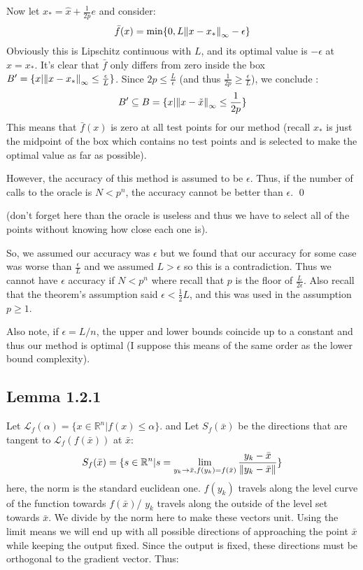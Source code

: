 \documentclass[12pt,a4paper]{article}
\newcommand{\hlabel}{\phantomsection\label}
\begin{document}
	Now let $x_* = \hat{x} + \frac{1}{2p}e$ and consider:
	\begin{align*}
		\bar{f}(x) = \min \{0, L \norm{x-x_*}_\infty - \epsilon\}
	\end{align*}
	Obviously this is Lipschitz continuous with $L$, and its optimal value is $-\epsilon$ at $ x = x_*$. It's clear that $\bar{f}$ only differs from zero inside the box $B' = \{x| \norm{x - x_*}_\infty \leq \frac{\epsilon}{L}\}$.  Since $2p \leq \frac{L}{\epsilon}$ (and thus $\frac{1}{2p} \geq \frac{\epsilon}{L}$), we conclude :
	\begin{align*}
		B' \subseteq B = \{x | \norm{x - \tilde{x}}_\infty \leq \frac{1}{2p}\}
	\end{align*}
	This means that $\bar{f}(x)$ is zero at all test points for our method (recall $x_*$ is  just the midpoint of the box which contains no test points and is selected to make the optimal value as far as possible). 
	
	However, the accuracy of this method is assumed to be $\epsilon$. Thus, if the number of calls to the oracle is $N < p^n$, the accuracy cannot be better than $\epsilon$. \qed
	
	(don't forget here than the oracle is useless and thus we have to select all of the points without knowing how close each one is).
	
	So, we assumed our accuracy was $\epsilon$ but we found that our accuracy for some case was worse than $\frac{\epsilon}{L}$ and we assumed $L > \epsilon$ so this is a contradiction. Thus we cannot have $\epsilon$ accuracy if $N < p^n$ where recall that $p$ is the floor of $\frac{L}{2\epsilon}$. Also recall that the theorem's assumption said $\epsilon < \frac{1}{2}L$, and this was used in the assumption $p \geq 1$.
	
	Also note, if $\epsilon = L/n$, the upper and lower bounds coincide up to a constant and thus our method is optimal (I suppose this means of the same order as the lower bound complexity).
	
	\subsection*{Lemma 1.2.1}\hlabel{lem121}
	Let $\mathcal{L}_f(\alpha) = \{x \in \mathbb{R}^n | f(x) \leq \alpha \}$. and Let $S_f(\bar{x})$ be the directions that are tangent to $\mathcal{L}_f(f(\bar{x}))$ at $\bar{x}$:
	\begin{align*}
		S_f(\bar{x}) = \{s \in \mathbb{R}^n | s = \lim_{y_k \rightarrow \bar{x}, f(y_k)=f(\bar{x})} 
		\frac{y_k - \bar{x}}{\norm{y_k - \bar{x}}}\}
	\end{align*}
	here, the norm is the standard euclidean one. $f(y_k)$ travels along the level curve of the function towards $f(\bar{x})$/ $y_k$ travels along the outside of the level set towards $\bar{x}$. We divide by the norm here to  make these vectors unit. Using the limit means we will end up with all possible directions of approaching the point $\bar{x}$ while keeping the output fixed. Since the output is fixed, these directions must be orthogonal to the gradient vector. Thus:
	
\end{document}
